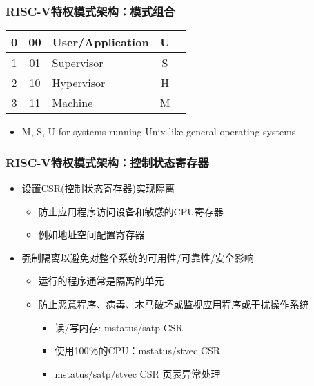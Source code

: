 
\begin{frame}
		\frametitle{RISC-V特权模式架构：\small{模式组合}}
\begin{table}[h]
 	\centering
 	\begin{tabular}{|c|c|l|c|l|}
 	\hline
	0 & 00 & User/Application & U \\\hline
	1 & 01 & Supervisor & S \\\hline
	2 & 10 & Hypervisor & H \\\hline
	3 & 11 & Machine & M \\\hline
   \end{tabular}
   \end{table}
\begin{itemize}
	
	\item M, S, U  for systems running Unix-like general operating systems
\end{itemize}


\end{frame}


\begin{frame}
	\frametitle{RISC-V特权模式架构：\small{控制状态寄存器}}

	\begin{itemize}
		\item 设置CSR(控制状态寄存器)实现隔离
		\begin{itemize}
			\item 防止应用程序访问设备和敏感的CPU寄存器
			\item 例如地址空间配置寄存器
		\end{itemize} 
	\end{itemize}

	\begin{itemize}
		\item 强制隔离以避免对整个系统的可用性/可靠性/安全影响
		\begin{itemize}
		\item 运行的程序通常是隔离的单元
		\item 防止恶意程序、病毒、木马破坏或监视应用程序或干扰操作系统	
			\begin{itemize}
			\item 读/写内存: mstatus/satp CSR
			\item 使用100％的CPU：mstatus/stvec CSR

			 	\item mstatus/satp/stvec CSR 页表异常处理

			\end{itemize}
		\end{itemize}
	\end{itemize}

\end{frame}

